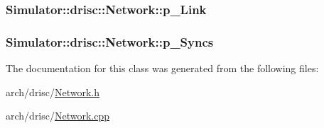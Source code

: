 \hypertarget{class_simulator_1_1drisc_1_1_network_a202fa6da0ed74edc4e2ad3853c13347b}{
\subsubsection[{p\+\_\+\+Link}]{ Simulator\+::drisc\+::\+Network\+::p\+\_\+\+Link}}\label{class_simulator_1_1drisc_1_1_network_a202fa6da0ed74edc4e2ad3853c13347b}
\hypertarget{class_simulator_1_1drisc_1_1_network_aea5b2bb71d1ebd56d9ae8ad6cf3c8066}{
\subsubsection[{p\+\_\+\+Syncs}]{ Simulator\+::drisc\+::\+Network\+::p\+\_\+\+Syncs}}\label{class_simulator_1_1drisc_1_1_network_aea5b2bb71d1ebd56d9ae8ad6cf3c8066}


The documentation for this class was generated from the following files\+:\begin{DoxyCompactItemize}
\item 
arch/drisc/\hyperlink{_network_8h}{Network.\+h}\item 
arch/drisc/\hyperlink{_network_8cpp}{Network.\+cpp}\end{DoxyCompactItemize}
